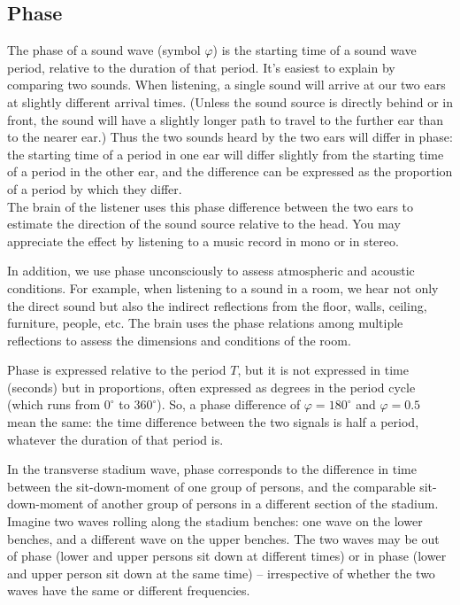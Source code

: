 \documentclass[
]{book}
\begin{document}
\subsection{Phase}\label{sec:phase}

The phase of a sound wave (symbol \(\varphi\)) is the starting time of a sound wave period, relative to the duration of that period. It's easiest to explain by comparing two sounds. When listening, a single sound will arrive at our two ears at slightly different arrival times. (Unless the sound source is directly behind or in front, the sound will have a slightly longer path to travel to the further ear than to the nearer ear.) Thus the two sounds heard by the two ears will differ in phase: the starting time of a period in one ear will differ slightly from the starting time of a period in the other ear, and the difference can be expressed as the proportion of a period by which they differ.\\
The brain of the listener uses this phase difference between the two ears to estimate the direction of the sound source relative to the head. You may appreciate the effect by listening to a music record in mono or in stereo.

In addition, we use phase unconsciously to assess atmospheric and acoustic conditions. For example, when listening to a sound in a room, we hear not only the direct sound but also the indirect reflections from the floor, walls, ceiling, furniture, people, etc. The brain uses the phase relations among multiple reflections to assess the dimensions and conditions of the room.

Phase is expressed relative to the period \(T\), but it is not expressed in time (seconds) but in proportions, often expressed as degrees in the period cycle (which runs from \(0^\circ\) to \(360^\circ\)). So, a phase difference of \(\varphi=180^\circ\) and \(\varphi=0.5\) mean the same: the time difference between the two signals is half a period, whatever the duration of that period is.

In the transverse stadium wave, phase corresponds to the difference in time between the sit-down-moment of one group of persons, and the comparable sit-down-moment of another group of persons in a different section of the stadium. Imagine two waves rolling along the stadium benches: one wave on the lower benches, and a different wave on the upper benches. The two waves may be out of phase (lower and upper persons sit down at different times) or in phase (lower and upper person sit down at the same time) -- irrespective of whether the two waves have the same or different frequencies.
\end{document}
